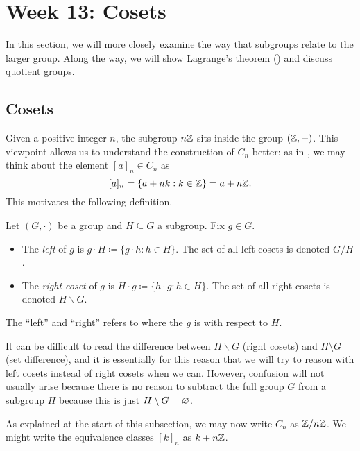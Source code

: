 \documentclass[../main.tex]{subfiles}
\begin{document}
\section{Week 13: Cosets}
In this section, we will more closely examine the way that subgroups relate to the larger group. Along the way, we will show Lagrange's theorem () and discuss quotient groups.

\subsection{Cosets}
Given a positive integer $n$, the subgroup $n\mathbb Z$ sits inside the group $(\mathbb Z,+)$. This viewpoint allows us to understand the construction of $C_n$ better: as in , we may think about the element $[a]_n\in C_n$ as
\[[a]_n=\{a+nk:k\in\mathbb Z\}=a+n\mathbb Z.\]
This motivates the following definition.
\begin{definition}[coset]
    Let $(G,\cdot)$ be a group and $H\subseteq G$ a subgroup. Fix $g\in G$.
    \begin{itemize}
        \item The \textit{left } of $g$ is $g\cdot H\coloneqq\{g\cdot h:h\in H\}$. The set of all left cosets is denoted $G/H$.
        \item The \textit{right coset} of $g$ is $H\cdot g\coloneqq\{h\cdot g:h\in H\}$. The set of all right cosets is denoted $H\backslash G$.
    \end{itemize}
    The ``left'' and ``right'' refers to where the $g$ is with respect to $H$.
\end{definition}
It can be difficult to read the difference between $H\backslash G$ (right cosets) and $H\setminus G$ (set difference), and it is essentially for this reason that we will try to reason with left cosets instead of right cosets when we can. However, confusion will not usually arise because there is no reason to subtract the full group $G$ from a subgroup $H$ because this is just $H\setminus G=\varnothing$.
\begin{notation}
    As explained at the start of this subsection, we may now write $C_n$ as $\mathbb Z/n\mathbb Z$. We might write the equivalence classes $[k]_n$ as $k+n\mathbb Z$.
\end{notation}
\end{document}
